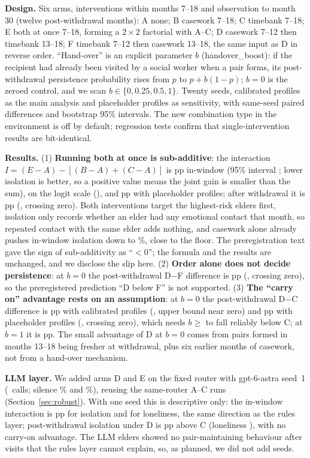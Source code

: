 \documentclass[10pt,twocolumn]{article}
\begin{document}
\textbf{Design.} Six arms, interventions within months 7--18 and observation to month 30 (twelve post-withdrawal months): A none; B casework 7--18; C timebank 7--18; E both at once 7--18, forming a $2\times2$ factorial with A--C; D casework 7--12 then timebank 13--18; F timebank 7--12 then casework 13--18, the same input as D in reverse order. ``Hand-over'' is an explicit parameter $b$ (handover\_boost): if the recipient had already been visited by a social worker when a pair forms, its post-withdrawal persistence probability rises from $p$ to $p+b(1-p)$; $b=0$ is the zeroed control, and we scan $b\in\{0,0.25,0.5,1\}$. Twenty seeds, calibrated profiles as the main analysis and placeholder profiles as sensitivity, with same-seed paired differences and bootstrap 95\% intervals. The new combination type in the environment is off by default; regression tests confirm that single-intervention results are bit-identical.

\textbf{Results.} (1) \textbf{Running both at once is sub-additive}: the interaction $I=(E-A)-[(B-A)+(C-A)]$ is \CbIntIv{} pp in-window (95\% interval \CbIntIvCI; lower isolation is better, so a positive value means the joint gain is smaller than the sum), \CbIntIvLogit{} on the logit scale (\CbIntIvLogitCI), and \CbIntIvPh{} pp with placeholder profiles; after withdrawal it is \CbIntPost{} pp (\CbIntPostCI, crossing zero). Both interventions target the highest-risk elders first, isolation only records whether an elder had any emotional contact that month, so repeated contact with the same elder adds nothing, and casework alone already pushes in-window isolation down to \CbIvB\%, close to the floor. The preregistration text gave the sign of sub-additivity as ``$<0$''; the formula and the results are unchanged, and we disclose the slip here. (2) \textbf{Order alone does not decide persistence}: at $b=0$ the post-withdrawal D$-$F difference is \CbDF{} pp (\CbDFCI, crossing zero), so the preregistered prediction ``D below F'' is not supported. (3) \textbf{The ``carry on'' advantage rests on an assumption}: at $b=0$ the post-withdrawal D$-$C difference is \CbDCZero{} pp with calibrated profiles (\CbDCZeroCI, upper bound near zero) and \CbDCZeroPh{} pp with placeholder profiles (\CbDCZeroPhCI, crossing zero), which needs $b\ge$\CbThreshPh{} to fall reliably below C; at $b=1$ it is \CbDCOne{} pp. The small advantage of D at $b=0$ comes from pairs formed in months 13--18 being fresher at withdrawal, plus six earlier months of casework, not from a hand-over mechanism.

\textbf{LLM layer.} We added arms D and E on the fixed router with gpt-6-astra seed~1 (\CallsAstraCombo\ calls; silence \CbLlmSilD\% and \CbLlmSilE\%), reusing the same-router A--C runs (Section~\ref{sec:robust}). With one seed this is descriptive only: the in-window interaction is \CbLlmIntIv{} pp for isolation and \CbLlmIntLonIv{} for loneliness, the same direction as the rules layer; post-withdrawal isolation under D is \CbLlmDCPost{} pp above C (loneliness \CbLlmDCLonPost), with no carry-on advantage. The LLM elders showed no pair-maintaining behaviour after visits that the rules layer cannot explain, so, as planned, we did not add seeds.
\end{document}
